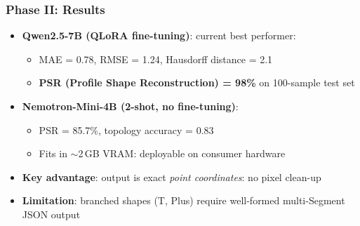 \begin{frame}[fragile]\frametitle{Phase II: Results}

  \begin{itemize}
    \item \textbf{Qwen2.5-7B (QLoRA fine-tuning)}: \alert{current best performer}:
      \begin{itemize}
        \item MAE = 0.78, RMSE = 1.24, Hausdorff distance = 2.1
        \item \textbf{PSR (Profile Shape Reconstruction) = 98\%} on 100-sample test set
      \end{itemize}
    \item \textbf{Nemotron-Mini-4B (2-shot, no fine-tuning)}:
      \begin{itemize}
        \item PSR = 85.7\%, topology accuracy = 0.83
        \item Fits in $\sim$2\,GB VRAM: deployable on consumer hardware
      \end{itemize}
    \item \textbf{Key advantage}: output is exact \textit{point coordinates}: no pixel clean-up
    \item \textbf{Limitation}: branched shapes (T, Plus) require well-formed multi-Segment JSON output
  \end{itemize}

\end{frame}


